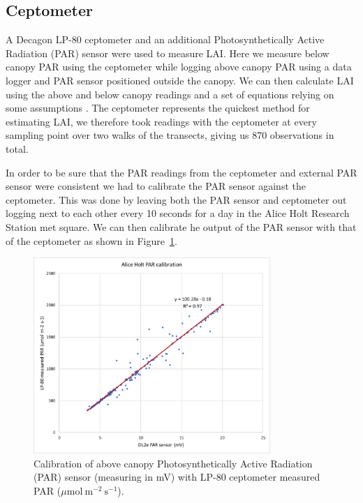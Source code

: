 \subsection{Ceptometer}

A Decagon LP-80 ceptometer and an additional Photosynthetically Active Radiation (PAR) sensor were used to measure LAI. Here we measure below canopy PAR using the ceptometer while logging above canopy PAR using a data logger and PAR sensor positioned outside the canopy. We can then calculate LAI using the above and below canopy readings and a set of equations relying on some assumptions \citep{fassnacht1994comparison}. The ceptometer represents the quickest method for estimating LAI, we therefore took readings with the ceptometer at every sampling point over two walks of the transects, giving us 870 observations in total.

In order to be sure that the PAR readings from the ceptometer and external PAR sensor were consistent we had to calibrate the PAR sensor against the ceptometer. This was done by leaving both the PAR sensor and ceptometer out logging next to each other every 10 seconds for a day in the Alice Holt Research Station met square. We can then calibrate he output of the PAR sensor with that of the ceptometer as shown in Figure~\ref{chap4:fig:par_calib}. 

\begin{figure}[ht]
    \centering
    \includegraphics[width=0.8\textwidth]{chapter/chapter4/AH_PAR.pdf}
    \caption{Calibration of above canopy Photosynthetically Active Radiation (PAR) sensor (measuring in mV) with LP-80 ceptometer measured PAR (\(\mu \text{mol}~\text{m}^{-2}~\text{s}^{-1} \)).} \label{chap4:fig:par_calib}
\end{figure}

